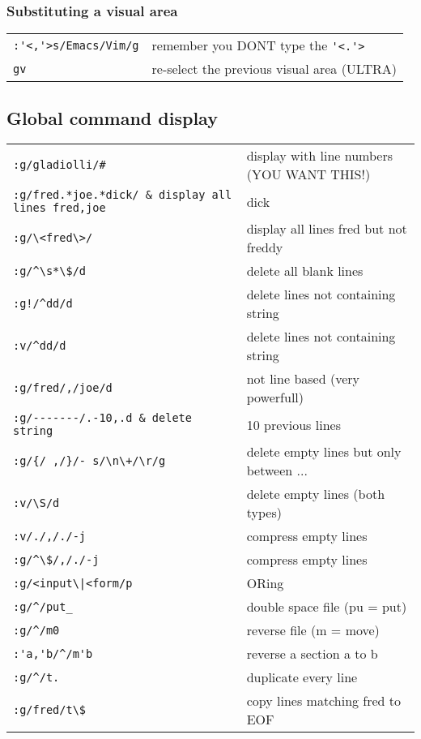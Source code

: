 \subsubsection{Substituting a visual area}
\begin{center}
\begin{longtable}{l|l}
 \verb!:'<,'>s/Emacs/Vim/g! & remember you DONT type the \verb!'<.'>!\\
 \verb!gv! & re-select the previous visual area (ULTRA)
\end{longtable}
\end{center}

\subsection{Global command display}
\begin{center}
\begin{longtable}{l|l}
 \verb!:g/gladiolli/#! & display with line numbers (YOU WANT THIS!)\\
 \verb!:g/fred.*joe.*dick/ & display all lines fred,joe !& dick\\
 \verb!:g/\<fred\>/! & display all lines fred but not freddy\\
 \verb!:g/^\s*\$/d! & delete all blank lines\\
 \verb?:g!/^dd/d? & delete lines not containing string\\
 \verb!:v/^dd/d! & delete lines not containing string\\
 \verb!:g/fred/,/joe/d! & not line based (very powerfull)\\
 \verb!:g/-------/.-10,.d & delete string !& 10 previous lines\\
 \verb!:g/{/ ,/}/- s/\n\+/\r/g! & delete empty lines but only between {...}\\
 \verb!:v/\S/d! & delete empty lines (both types)\\
 \verb!:v/./,/./-j! & compress empty lines\\
 \verb!:g/^\$/,/./-j! & compress empty lines\\
 \verb!:g/<input\|<form/p! & ORing\\
 \verb!:g/^/put_! & double space file (pu = put)\\
 \verb!:g/^/m0! & reverse file (m = move)\\
 \verb!:'a,'b/^/m'b! & reverse a section a to b\\
 \verb!:g/^/t.! & duplicate every line\\
 \verb!:g/fred/t\$! & copy lines matching fred to EOF\\

\end{longtable}
\end{center}
